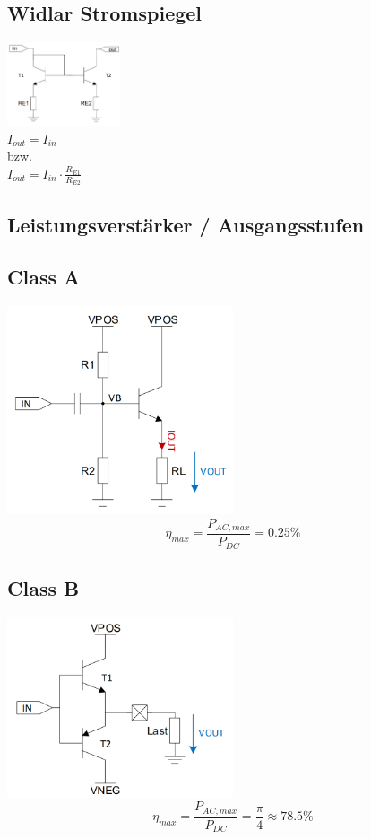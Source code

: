 \documentclass[margin=normal]{tex/hsrzf}
\begin{document}
\subsection*{Widlar Stromspiegel}
\includegraphics[width = 0.25\textwidth]{img/Transistor/Widlar.png}
\\$I_{out} = I_{in}$
\\bzw.
\\$I_{out} = I_{in} \cdot \frac{R_{E1}}{R_{E2}}$
\subsection{Leistungsverstärker / Ausgangsstufen}
\begin{minipage}{0.33\textwidth}
  \subsection*{Class A}
  \includegraphics[width = 0.5\textwidth]{img/Verstärker/ClassAVerstärker.png}
  $$\eta_{max} = \frac{P_{AC,max}}{P_{DC}} = 0.25\%$$
\end{minipage}%
\begin{minipage}{0.33\textwidth}
  \subsection*{Class B}
  \includegraphics[width = 0.5\textwidth]{img/Verstärker/ClassBVerstärker.png}
  $$\eta_{max} = \frac{P_{AC,max}}{P_{DC}} = \frac{\pi}{4} \approx 78.5\%$$
\end{minipage}%
\end{document}

